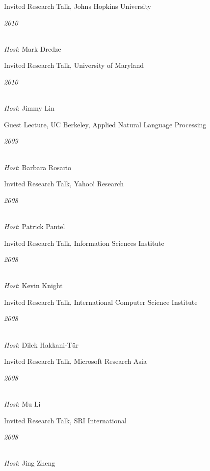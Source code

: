 \documentclass[margin,line]{res}
\newcommand{\dated}[2]{\parbox[t]{4.4in}{#1} \hspace{0.4in}
											 \parbox[t]{1in}{ {\it #2 } } }
\begin{document}
\begin{resume}
\dated{Invited Research Talk, Johns Hopkins University}{2010} \\
{\em Host}: Mark Dredze

\dated{Invited Research Talk, University of Maryland}{2010} \\
{\em Host}: Jimmy Lin

\dated{Guest Lecture, UC Berkeley, Applied Natural Language Processing}{2009} \\
{\em Host}: Barbara Rosario

\dated{Invited Research Talk, Yahoo! Research}{2008} \\
{\em Host}: Patrick Pantel

\dated{Invited Research Talk, Information Sciences Institute}{2008} \\
{\em Host}: Kevin Knight

\dated{Invited Research Talk, International Computer Science Institute}{2008} \\
{\em Host}: Dilek Hakkani-T\"{u}r

\dated{Invited Research Talk, Microsoft Research Asia}{2008} \\
{\em Host}: Mu Li

\dated{Invited Research Talk, SRI International}{2008} \\
{\em Host}: Jing Zheng

\end{resume}
\end{document}
